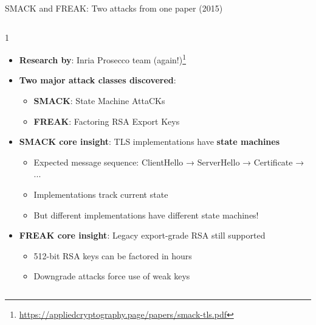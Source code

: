 \documentclass[aspectratio=169, lualatex, handout]{beamer}
\begin{document}
\begin{frame}{SMACK and FREAK: Two attacks from one paper (2015)}
	\begin{columns}[c]
		\begin{column}{1\textwidth}
			\begin{itemize}[<+->]
				\item \textbf{Research by}: Inria Prosecco team (again!)\footnote{\url{https://appliedcryptography.page/papers/smack-tls.pdf}}
				\item \textbf{Two major attack classes discovered}:
				      \begin{itemize}
					      \item \textbf{SMACK}: State Machine AttaCKs
					      \item \textbf{FREAK}: Factoring RSA Export Keys
				      \end{itemize}
				\item \textbf{SMACK core insight}: TLS implementations have \textbf{state machines}
				      \begin{itemize}
					      \item Expected message sequence: ClientHello → ServerHello → Certificate → ...
					      \item Implementations track current state
					      \item But different implementations have different state machines!
				      \end{itemize}
				\item \textbf{FREAK core insight}: Legacy export-grade RSA still supported
				      \begin{itemize}
					      \item 512-bit RSA keys can be factored in hours
					      \item Downgrade attacks force use of weak keys
				      \end{itemize}
			\end{itemize}
		\end{column}
	\end{columns}
\end{frame}
\end{document}
